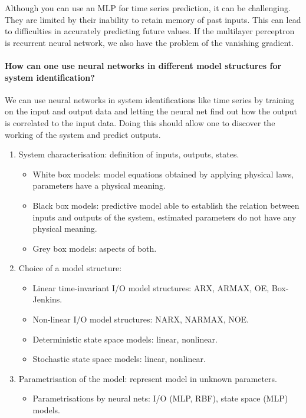 Although you can use an MLP for time series prediction, it can be challenging. They are limited by their inability to
retain memory of past inputs. This can lead to difficulties in accurately predicting future values. If the
multilayer perceptron is recurrent neural network, we also have the problem of the vanishing
gradient.

\paragraph{How can one use neural networks in different model structures for system identification?}

We can use neural networks in system identifications like time series by training on the input and
output data and letting the neural net find out how the output is correlated to the input data. Doing
this should allow one to discover the working of the system and predict outputs.

\begin{enumerate}
    \item System characterisation: definition of inputs, outputs, states.
    \begin{itemize}
        \item White box models: model equations obtained by applying physical laws, parameters have a physical meaning.
        \item Black box models: predictive model able to establish the relation between inputs and outputs of the system, estimated parameters do not have any physical meaning.
        \item Grey box models: aspects of both.
    \end{itemize}
    \item Choice of a model structure:
    \begin{itemize}
        \item Linear time-invariant I/O model structures: ARX, ARMAX, OE, Box-Jenkins.
        \item Non-linear I/O model structures: NARX, NARMAX, NOE.
        \item Deterministic state space models: linear, nonlinear.
        \item Stochastic state space models: linear, nonlinear.
    \end{itemize}
    \item Parametrisation of the model: represent model in unknown parameters.
    \begin{itemize}
        \item Parametrisations by neural nets: I/O (MLP, RBF), state space (MLP) models.
    \end{itemize}
\end{enumerate}

